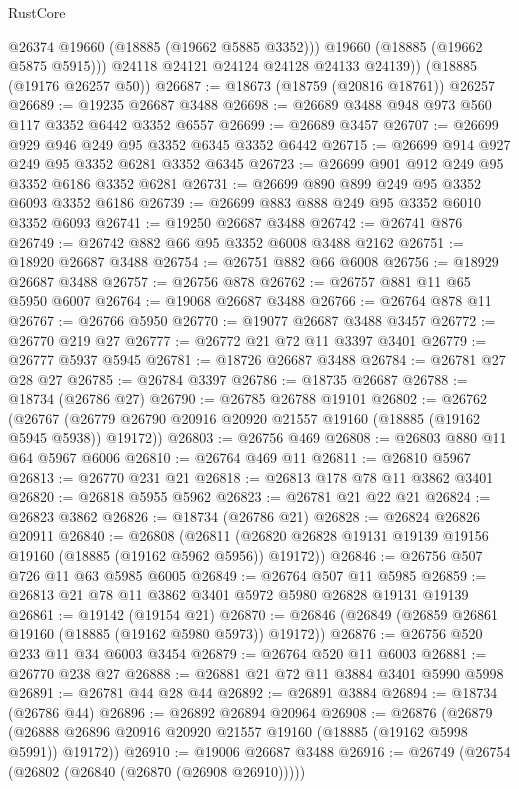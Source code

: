 \begin{lexlean}{RustCore}
\begin{coremodule}
            @26374
            @19660
            (@18885 (@19662 @5885 @3352)))
          @19660
          (@18885 (@19662 @5875 @5915)))
        @24118
        @24121
        @24124
        @24128
        @24133
        @24139))
    (@18885 (@19176 @26257 @50))
@26687 := @18673 (@18759 (@20816 @18761)) @26257
@26689 := @19235 @26687 @3488
@26698 := @26689 @3488 @948 @973 @560 @117 @3352 @6442 @3352 @6557
@26699 := @26689 @3457
@26707 := @26699 @929 @946 @249 @95 @3352 @6345 @3352 @6442
@26715 := @26699 @914 @927 @249 @95 @3352 @6281 @3352 @6345
@26723 := @26699 @901 @912 @249 @95 @3352 @6186 @3352 @6281
@26731 := @26699 @890 @899 @249 @95 @3352 @6093 @3352 @6186
@26739 := @26699 @883 @888 @249 @95 @3352 @6010 @3352 @6093
@26741 := @19250 @26687 @3488
@26742 := @26741 @876
@26749 := @26742 @882 @66 @95 @3352 @6008 @3488 @2162
@26751 := @18920 @26687 @3488
@26754 := @26751 @882 @66 @6008
@26756 := @18929 @26687 @3488
@26757 := @26756 @878
@26762 := @26757 @881 @11 @65 @5950 @6007
@26764 := @19068 @26687 @3488
@26766 := @26764 @878 @11
@26767 := @26766 @5950
@26770 := @19077 @26687 @3488 @3457
@26772 := @26770 @219 @27
@26777 := @26772 @21 @72 @11 @3397 @3401
@26779 := @26777 @5937 @5945
@26781 := @18726 @26687 @3488
@26784 := @26781 @27 @28 @27
@26785 := @26784 @3397
@26786 := @18735 @26687
@26788 := @18734 (@26786 @27)
@26790 := @26785 @26788 @19101
@26802 := @26762
    (@26767 (@26779 @26790 @20916 @20920 @21557 @19160 (@18885 (@19162 @5945 @5938)) @19172))
@26803 := @26756 @469
@26808 := @26803 @880 @11 @64 @5967 @6006
@26810 := @26764 @469 @11
@26811 := @26810 @5967
@26813 := @26770 @231 @21
@26818 := @26813 @178 @78 @11 @3862 @3401
@26820 := @26818 @5955 @5962
@26823 := @26781 @21 @22 @21
@26824 := @26823 @3862
@26826 := @18734 (@26786 @21)
@26828 := @26824 @26826 @20911
@26840 := @26808
    (@26811 (@26820 @26828 @19131 @19139 @19156 @19160 (@18885 (@19162 @5962 @5956)) @19172))
@26846 := @26756 @507 @726 @11 @63 @5985 @6005
@26849 := @26764 @507 @11 @5985
@26859 := @26813 @21 @78 @11 @3862 @3401 @5972 @5980 @26828 @19131 @19139
@26861 := @19142 (@19154 @21)
@26870 := @26846 (@26849 (@26859 @26861 @19160 (@18885 (@19162 @5980 @5973)) @19172))
@26876 := @26756 @520 @233 @11 @34 @6003 @3454
@26879 := @26764 @520 @11 @6003
@26881 := @26770 @238 @27
@26888 := @26881 @21 @72 @11 @3884 @3401 @5990 @5998
@26891 := @26781 @44 @28 @44
@26892 := @26891 @3884
@26894 := @18734 (@26786 @44)
@26896 := @26892 @26894 @20964
@26908 := @26876
    (@26879 (@26888 @26896 @20916 @20920 @21557 @19160 (@18885 (@19162 @5998 @5991)) @19172))
@26910 := @19006 @26687 @3488
@26916 := @26749 (@26754 (@26802 (@26840 (@26870 (@26908 @26910)))))

\end{coremodule}
\end{lexlean}

